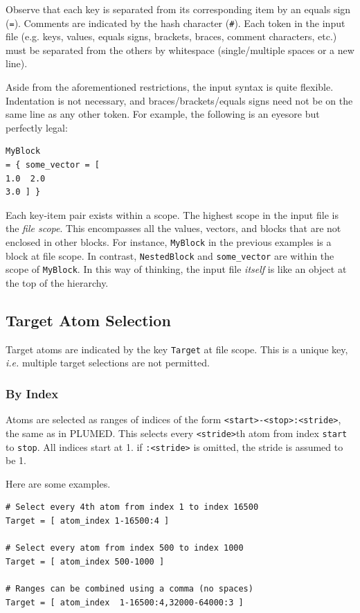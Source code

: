 \documentclass[11pt,notitlepage]{article}
\begin{document}
Observe that each key is separated from its corresponding item by an equals sign (\texttt{=}). Comments are indicated by the hash character (\texttt{\#}). Each token in the input file (e.g. keys, values, equals signs, brackets, braces, comment characters, etc.) must be separated from the others by whitespace (single/multiple spaces or a new line). 

Aside from the aforementioned restrictions, the input syntax is quite flexible. Indentation is not necessary, and braces/brackets/equals signs need not be on the same line as any other token. For example, the following is an eyesore but perfectly legal:

\begin{lstlisting}
MyBlock 
= { some_vector = [ 
1.0  2.0  
3.0 ] }
\end{lstlisting}


Each key-item pair exists within a scope. The highest scope in the input file is the \emph{file scope}. This encompasses all the values, vectors, and blocks that are not enclosed in other blocks. For instance, \texttt{MyBlock} in the previous examples is a block at file scope. In contrast, \texttt{NestedBlock} and \texttt{some\_vector} are within the scope of \texttt{MyBlock}. In this way of thinking, the input file \emph{itself} is like an object at the top of the hierarchy.


\subsection{Target Atom Selection}

Target atoms are indicated by the key \texttt{Target} at file scope. This is a unique key, \emph{i.e.} multiple target selections are not permitted.

\subsubsection{By Index}

Atoms are selected as ranges of indices of the form \texttt{<start>-<stop>:<stride>}, the same as in PLUMED. This selects every \texttt{<stride>}th atom from index \texttt{start} to \texttt{stop}. All indices start at 1. if \texttt{:<stride>} is omitted, the stride is assumed to be 1.

Here are some examples.

\begin{lstlisting}
# Select every 4th atom from index 1 to index 16500
Target = [ atom_index 1-16500:4 ]

# Select every atom from index 500 to index 1000
Target = [ atom_index 500-1000 ]

# Ranges can be combined using a comma (no spaces)
Target = [ atom_index  1-16500:4,32000-64000:3 ]
\end{lstlisting}
\end{document}
